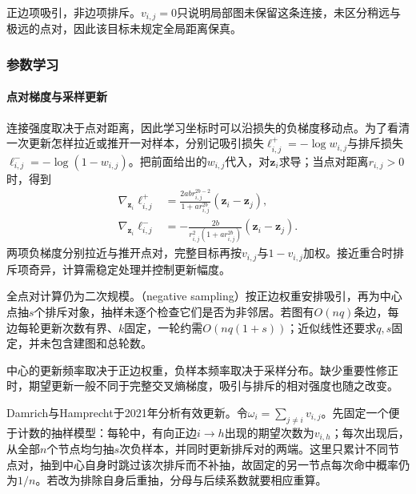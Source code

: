 正边项吸引，非边项排斥。$v_{i,j}=0$只说明局部图未保留这条连接，未区分稍远与极远的点对，因此该目标未规定全局距离保真。

\subsubsection{参数学习}

\paragraph{点对梯度与采样更新}

连接强度取决于点对距离，因此学习坐标时可以沿损失的负梯度移动点。为了看清一次更新怎样拉近或推开一对样本，分别记吸引损失$\ell^+_{i,j}=-\log w_{i,j}$与排斥损失$\ell^-_{i,j}=-\log(1-w_{i,j})$。把前面给出的$w_{i,j}$代入，对$\bm z_i$求导；当点对距离$r_{i,j}>0$时，得到
\begin{equation}
  \label{eq:dim-umap-pair-gradient}
  \begin{aligned}
    \nabla_{\bm{z}_i}\ell^+_{i,j}
      &=\frac{2ab r_{i,j}^{2b-2}}
        {1+a r_{i,j}^{2b}}(\bm{z}_i-\bm{z}_j),\\
    \nabla_{\bm{z}_i}\ell^-_{i,j}
      &=-\frac{2b}
        {r_{i,j}^2(1+a r_{i,j}^{2b})}
        (\bm{z}_i-\bm{z}_j).
  \end{aligned}
\end{equation}
两项负梯度分别拉近与推开点对，完整目标再按$v_{i,j}$与$1-v_{i,j}$加权。接近重合时排斥项奇异，计算需稳定处理并控制更新幅度。

全点对计算仍为二次规模。（negative sampling）按正边权重安排吸引，再为中心点抽$s$个排斥对象，抽样未逐个检查它们是否为非邻居。若图有$O(nq)$条边，每边每轮更新次数有界、$k$固定，一轮约需$O(nq(1+s))$；近似线性还要求$q,s$固定，并未包含建图和总轮数。

中心的更新频率取决于正边权重，负样本频率取决于采样分布。缺少重要性修正时，期望更新一般不同于完整交叉熵梯度，吸引与排斥的相对强度也随之改变。

Damrich与Hamprecht于2021年分析有效更新。令$\omega_i=\sum_{j\ne i}v_{i,j}$。先固定一个便于计数的抽样模型：每轮中，有向正边$i\to h$出现的期望次数为$v_{i,h}$；每次出现后，从全部$n$个节点均匀抽$s$次负样本，并同时更新排斥对的两端。这里只累计不同节点对，抽到中心自身时跳过该次排斥而不补抽，故固定的另一节点每次命中概率仍为$1/n$。若改为排除自身后重抽，分母与后续系数就要相应重算。


